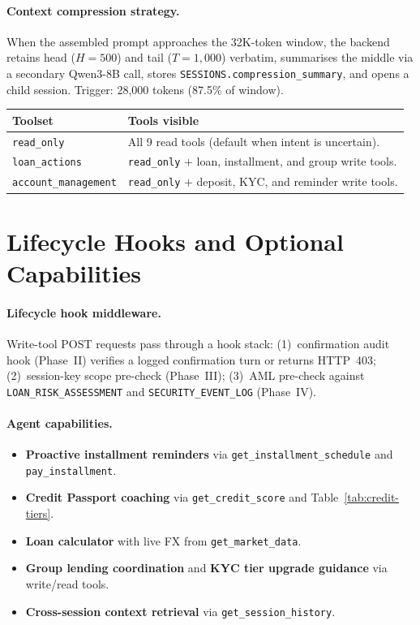 \documentclass[12pt,a4paper]{report}
\newcommand{\tableheadcolor}{\rowcolor{TableHeadBg}}
\begin{document}
\paragraph{Context compression strategy.}
When the assembled prompt approaches the 32K-token window, the backend retains head ($H{=}500$) and tail ($T{=}1{,}000$) verbatim, summarises the middle via a secondary Qwen3-8B call, stores \texttt{SESSIONS.compression\_summary}, and opens a child session. Trigger: 28{,}000 tokens (87.5\% of window).

\begin{table}[H]
\centering
\begin{tabular}{p{3.5cm}p{9cm}}
\toprule
\tableheadcolor
\textbf{Toolset} & \textbf{Tools visible} \\
\midrule
\texttt{read\_only} & All 9 read tools (default when intent is uncertain). \\
\texttt{loan\_actions} & \texttt{read\_only} $+$ loan, installment, and group write tools. \\
\texttt{account\_management} & \texttt{read\_only} $+$ deposit, KYC, and reminder write tools. \\
\bottomrule
\end{tabular}
\end{table}

\section{Lifecycle Hooks and Optional Capabilities}

\paragraph{Lifecycle hook middleware.}
Write-tool POST requests pass through a hook stack: (1)~confirmation audit hook (Phase~II) verifies a logged confirmation turn or returns HTTP~403; (2)~session-key scope pre-check (Phase~III); (3)~AML pre-check against \texttt{LOAN\_RISK\_ASSESSMENT} and \texttt{SECURITY\_EVENT\_LOG} (Phase~IV).

\paragraph{Agent capabilities.}
\begin{itemize}[noitemsep]
\item \textbf{Proactive installment reminders} via \texttt{get\_installment\_schedule} and \texttt{pay\_installment}.
\item \textbf{Credit Passport coaching} via \texttt{get\_credit\_score} and Table~\ref{tab:credit-tiers}.
\item \textbf{Loan calculator} with live FX from \texttt{get\_market\_data}.
\item \textbf{Group lending coordination} and \textbf{KYC tier upgrade guidance} via write/read tools.
\item \textbf{Cross-session context retrieval} via \texttt{get\_session\_history}.
\end{itemize}
\end{document}
